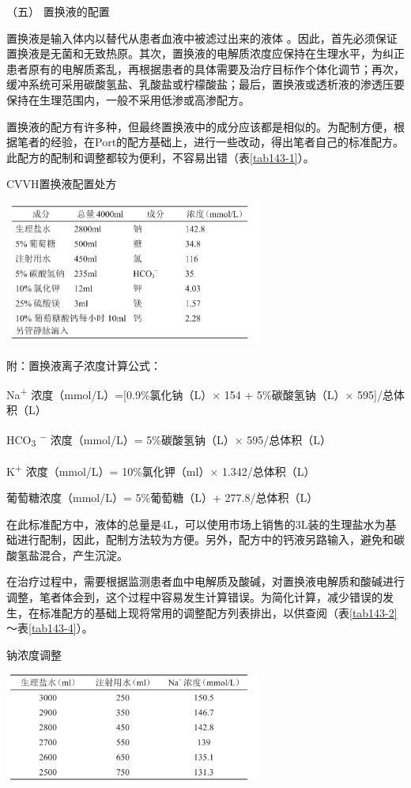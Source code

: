\hypertarget{text00391.htmlux5cux23CHP16-10-2-3-5}{}
（五） 置换液的配置

置换液是输入体内以替代从患者血液中被滤过出来的液体
。因此，首先必须保证置换液是无菌和无致热原。其次，置换液的电解质浓度应保持在生理水平，为纠正患者原有的电解质紊乱，再根据患者的具体需要及治疗目标作个体化调节；再次，缓冲系统可采用碳酸氢盐、乳酸盐或柠檬酸盐；最后，置换液或透析液的渗透压要保持在生理范围内，一般不采用低渗或高渗配方。

置换液的配方有许多种，但最终置换液中的成分应该都是相似的。为配制方便，根据笔者的经验，在Port的配方基础上，进行一些改动，得出笔者自己的标准配方。此配方的配制和调整都较为便利，不容易出错（表\ref{tab143-1}）。

\begin{table}[htbp]
\centering
\caption{CVVH置换液配置处方}
\label{tab143-1}
\includegraphics[width=3.36458in,height=1.84375in]{./images/Image00528.jpg}
\end{table}

附：置换液离子浓度计算公式：

Na\textsuperscript{+} 浓度（mmol/L）={[}0.9\%氯化钠（L）× 154 +
5\%碳酸氢钠（L）× 595{]}/总体积（L）

HCO\textsubscript{3} \textsuperscript{−} 浓度（mmol/L）=
5\%碳酸氢钠（L）× 595/总体积（L）

K\textsuperscript{+} 浓度（mmol/L）= 10\%氯化钾（ml）× 1.342/总体积（L）

葡萄糖浓度（mmol/L）= 5\%葡萄糖（L）+ 277.8/总体积（L）

在此标准配方中，液体的总量是4L，可以使用市场上销售的3L装的生理盐水为基础进行配制，因此，配制方法较为方便。另外，配方中的钙液另路输入，避免和碳酸氢盐混合，产生沉淀。

在治疗过程中，需要根据监测患者血中电解质及酸碱，对置换液电解质和酸碱进行调整，笔者体会到，这个过程中容易发生计算错误。为简化计算，减少错误的发生，在标准配方的基础上现将常用的调整配方列表排出，以供查阅（表\ref{tab143-2}～表\ref{tab143-4}）。

\begin{table}[htbp]
\centering
\caption{钠浓度调整}
\label{tab143-2}
\includegraphics[width=3.3125in,height=1.42708in]{./images/Image00529.jpg}
\end{table}

